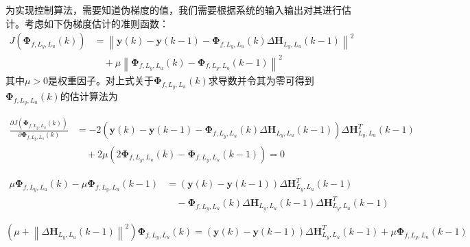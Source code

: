       为实现控制算法，需要知道伪梯度的值，我们需要根据系统的输入输出对其进行估计。考虑如下伪梯度估计的准则函数：
      \begin{equation}
      \begin{aligned}
      J\left( \boldsymbol{\Phi}_{f,L_y,L_u}(k) \right) &= \left\| \boldsymbol{y}(k) - \boldsymbol{y}(k - 1) - \boldsymbol{\Phi}_{f,L_y,L_u}(k) \Delta \boldsymbol{H}_{L_y,L_u}(k - 1) \right\|^2 \\
      &\quad + \mu \left\| \boldsymbol{\Phi}_{f,L_y,L_u}(k) - \boldsymbol{\Phi}_{f,L_y,L_u}(k - 1) \right\|^2
      \end{aligned}
      \label{eq:phi_estimation_criterion}
      \end{equation}
      其中$\mu > 0$是权重因子。对上式关于$\boldsymbol{\Phi}_{f,L_y,L_u}(k)$求导数并令其为零可得到$\boldsymbol{\Phi}_{f,L_y,L_u}(k)$的估计算法为


      \begin{equation}
      \begin{aligned}
      \frac{\partial J\left( \boldsymbol{\Phi}_{f,L_y,L_u}(k) \right)}{\partial \boldsymbol{\Phi}_{f,L_y,L_u}(k)} &= -2 \left( \boldsymbol{y}(k) - \boldsymbol{y}(k - 1) - \boldsymbol{\Phi}_{f,L_y,L_u}(k) \Delta \boldsymbol{H}_{L_y,L_u}(k - 1) \right) \Delta \boldsymbol{H}_{L_y,L_u}^T(k - 1) \\
      &\quad + 2\mu \left( 2 \boldsymbol{\Phi}_{f,L_y,L_u}(k) - \boldsymbol{\Phi}_{f,L_y,L_u}(k - 1) \right) = 0
      \end{aligned}
      \label{eq:phi_derivative}
      \end{equation}

      \begin{equation}
      \begin{aligned}
      \mu \boldsymbol{\Phi}_{f,L_y,L_u}(k) - \mu \boldsymbol{\Phi}_{f,L_y,L_u}(k - 1) &= \left( \boldsymbol{y}(k) - \boldsymbol{y}(k - 1) \right) \Delta \boldsymbol{H}_{L_y,L_u}^T(k - 1) \\
      &\quad - \boldsymbol{\Phi}_{f,L_y,L_u}(k) \Delta \boldsymbol{H}_{L_y,L_u}(k - 1) \Delta \boldsymbol{H}_{L_y,L_u}^T(k - 1)
      \end{aligned}
      \label{eq:phi_derivative_expanded}
      \end{equation}

      \begin{equation}
      \left( \mu + \left\| \Delta \boldsymbol{H}_{L_y,L_u}(k - 1) \right\|^2 \right) \boldsymbol{\Phi}_{f,L_y,L_u}(k) = \left( \boldsymbol{y}(k) - \boldsymbol{y}(k - 1) \right) \Delta \boldsymbol{H}_{L_y,L_u}^T(k - 1) + \mu \boldsymbol{\Phi}_{f,L_y,L_u}(k - 1)
      \label{eq:phi_linear}
      \end{equation}

